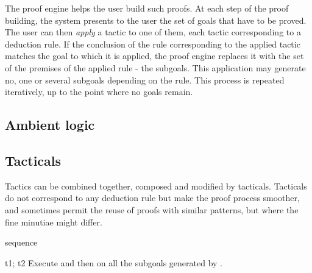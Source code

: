 The \EasyCrypt proof engine helps the user build such proofs. At each step
of the proof building, the system presents to the user the set of goals
that have to be proved. The user can then \emph{apply} a tactic to one of
them, each tactic corresponding to a deduction rule. If the conclusion
of the rule corresponding to the applied tactic matches the goal to which
it is applied, the proof engine replaces it with the set of the
premises of the applied rule - the subgoals. This application may generate
no, one or several subgoals depending on the rule. This process is repeated
iteratively, up to the point where no goals remain.

\subsection{Ambient logic}
































\subsection{Tacticals}

Tactics can be combined together, composed and modified by tacticals. Tacticals do not
correspond to any deduction rule but make the proof process smoother, and sometimes permit
the reuse of proofs with similar patterns, but where the fine minutiae might differ.

\begin{tactic}[t1; t2]{sequence}
  \begin{tsyntax}[empty]{t1; t2}
  Execute  and then  on all the subgoals generated by .
  \end{tsyntax}
\end{tactic}

